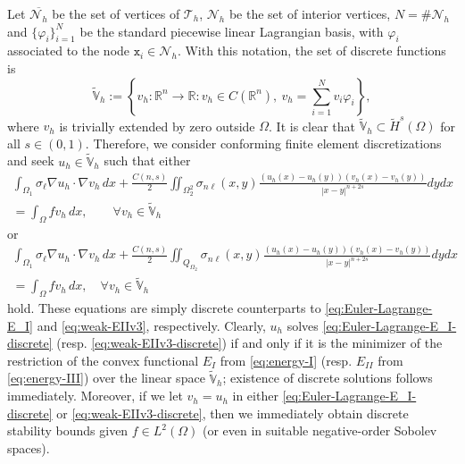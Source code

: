 \documentclass{amsart}
\newcommand{\Ol}{\Omega_{1}}%
\newcommand{\Onl}{\Omega_{2}}%
\renewcommand{\sl}{{\sigma_\ell}}
\newcommand{\snl}{{\sigma_{n\ell}}}
\newcommand{\Th}{{\mathcal {T}_h}}
\def\R{{\mathbb R}}
\newcommand{\phii}{{\varphi}}
\newcommand{\x}{\texttt{x}}
\theoremstyle{plain}
\numberwithin{equation}{section}
\numberwithin{table}{section}
\numberwithin{figure}{section}
\numberwithin{theorem}{section}
\numberwithin{corollary}{section}
\numberwithin{definition}{section}
\numberwithin{lemma}{section}
\numberwithin{proposition}{section}
\numberwithin{remark}{section}
\begin{document}
Let $\overline{\mathcal{N}_h}$ be the set of vertices of $\Th$, $\mathcal{N}_h$ be the set of interior vertices, $N = \#\mathcal{N}_h$  and $\{ \varphi_i \}_{i=1}^N$ be the standard piecewise linear Lagrangian basis, with $\phii_i$ associated to the node $\x_i \in \mathcal{N}_h$. With this notation, the set of discrete functions is
\begin{equation*} \label{eq:FE_space}
\widetilde{\mathbb{V}}_h :=  \left\{v_h: \R^n \to \R \colon v_h \in C(\R^n), \ v_h = \sum_{i=1}^N v_i \varphi_i \right\},
 \end{equation*}
where $v_h$ is trivially extended by zero outside $\Omega$. It is clear that $\widetilde{\mathbb{V}}_h \subset \widetilde{H}^s(\Omega)$ for all $s \in (0,1)$. Therefore, we consider conforming finite element discretizations and seek $u_h \in \widetilde{\mathbb{V}}_h$ such that either
%
\begin{equation} \label{eq:Euler-Lagrange-E_I-discrete} \begin{aligned}
 \int_{\Ol} \sl \nabla u_h \cdot \nabla v_h\, dx + \frac{ C(n,s) }{2} \iint_{\Onl^2} \snl(x,y) \frac{(u_h(x)-u_h(y))(v_h(x)-v_h(y))}{|x-y|^{n+2s}} dy dx  \\
= \int_\Omega f v_h \, dx, \qquad \forall v_h \in \widetilde{\mathbb{V}}_h
\end{aligned}
\end{equation}
or 
\begin{equation} \label{eq:weak-EIIv3-discrete} \begin{aligned}
\int_{\Ol}  \sl \nabla u_h \cdot \nabla v_h\, dx + \frac{C(n,s)}{2}  \iint_{Q_{\Onl}} \snl(x,y) \frac{(u_h(x)-u_h(y))(v_h(x)-v_h(y))}{|x-y|^{n+2s}} dy dx\\ 
= \int_\Omega f v_h \, dx, \quad \forall v_h \in \widetilde{\mathbb{V}}_h
\end{aligned} \end{equation}
hold. These equations are simply discrete counterparts to \eqref{eq:Euler-Lagrange-E_I} and \eqref{eq:weak-EIIv3}, respectively.
Clearly, $u_h$ solves \eqref{eq:Euler-Lagrange-E_I-discrete} (resp. \eqref{eq:weak-EIIv3-discrete}) if and only if it is the minimizer of the restriction of the convex functional $E_I$ from \eqref{eq:energy-I} (resp. $E_{II}$ from \eqref{eq:energy-III}) over the linear space $\widetilde{\mathbb{V}}_h$; existence of discrete solutions follows immediately. 
Moreover, if we let $v_h = u_h$ in either \eqref{eq:Euler-Lagrange-E_I-discrete} or \eqref{eq:weak-EIIv3-discrete}, then we immediately obtain discrete stability bounds given $f \in L^2(\Omega)$ (or even in suitable negative-order Sobolev spaces).
\end{document}
